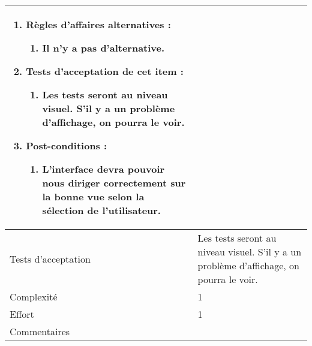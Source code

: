 \begin{longtable}{|l|p{}|}
\begin{enumerate}[label*=\arabic*.]
\begin{enumerate}[label*=\arabic*.]
\begin{enumerate}[label*=\arabic*.]
                                \end{enumerate}
                                \item Règles d'affaires alternatives :
                                \begin{enumerate}[label*=\arabic*.]
                                    \item Il n'y a pas d'alternative.
                                \end{enumerate}
                                \item Tests d'acceptation de cet item :
                                \begin{enumerate}[label*=\arabic*.]
                                    \item Les tests seront au niveau visuel. S'il y a un problème d'affichage, on pourra le voir.
                                \end{enumerate}
                                \item Post-conditions :
                                \begin{enumerate}[label*=\arabic*.]
                                    \item L'interface devra pouvoir nous diriger correctement sur la bonne vue selon la sélection de l'utilisateur.
                                \end{enumerate}
                            \end{enumerate}                
        \end{enumerate} \\
\hline
    Tests d'acceptation & Les tests seront au niveau visuel. S'il y a un problème d'affichage, on pourra le voir. \\
\hline
    Complexité & 1 \\
\hline
    Effort & 1 \\
\hline
    Commentaires &  \\


\end{longtable}
